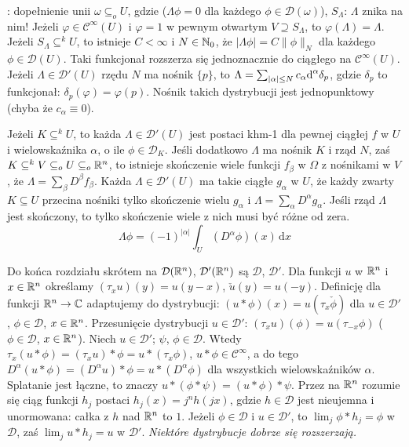 :  dopełnienie unii $\omega \subseteq_o U$, gdzie  ($\Lambda \phi = 0$ dla każdego $\phi \in \mathcal D(\omega)$), $S_\Lambda$: $\Lambda$ znika na nim!
Jeżeli $\varphi \in \mathscr C^\infty (U)$ i $\varphi = 1$ w pewnym otwartym $V \supseteq S_\Lambda$, to $\varphi(\Lambda) = \Lambda$.
Jeżeli $S_\Lambda \subseteq^k U$, to istnieje $C < \infty$ i $N \in \mathbb N_0$, że $|\Lambda \phi| = C \|\phi\|_N$ dla każdego $\phi \in \mathcal D(U)$.
Taki funkcjonał rozszerza się jednoznacznie do ciągłego na $\mathscr C^\infty (U)$.
Jeżeli $\Lambda \in \mathcal D'(U)$ rzędu $N$ ma nośnik $\{p\}$, to $\Lambda = \sum_{|\alpha| \le N} c_\alpha \textrm{d}^\alpha \delta_p$, gdzie $\delta_p$ to funkcjonał: $\delta_p(\varphi) = \varphi(p)$.
Nośnik takich dystrybucji jest jednopunktowy (chyba że $c_\alpha \equiv 0$).

Jeżeli  $K \subseteq^k U$, to każda $\Lambda \in \mathcal D'(U)$ jest postaci khm-1 dla pewnej ciągłej $f$ w $U$ i wielowskaźnika $\alpha$, o ile $\phi \in \mathcal D_K$.
Jeśli dodatkowo $\Lambda$ ma nośnik $K$ i rząd $N$, zaś $K \subseteq^k V \subseteq_o U \subseteq_o \mathbb{R}^n$, to istnieje skończenie wiele funkcji $f_\beta$ w $\Omega$ z nośnikami w $V$, że $\Lambda = \sum_\beta D^\beta f_\beta$.
Każda $\Lambda \in \mathcal D'(U)$ ma takie ciągłe $g_\alpha$ w $U$, że każdy zwarty $K \subseteq U$ przecina nośniki tylko skończenie wielu $g_\alpha$ i $\Lambda = \sum_\alpha D^\alpha g_\alpha$.
Jeśli rząd $\Lambda$ jest skończony, to tylko skończenie wiele z nich musi być różne od zera.
\[
	\Lambda \phi = (-1)^{|\alpha|} \int_U (D^\alpha \phi)(x) \,\textrm{d} x
\]

Do końca  rozdziału skrótem na $\mathcal D(\mathbb{R}^n)$, $\mathcal D'(\mathbb{R}^n)$ są $\mathcal D$, $\mathcal D'$.
Dla funkcji $u$ w $\mathbb{R}^n$ i $x \in \mathbb{R}^n$ określamy $(\tau_x u) (y) = u(y-x)$, $\check u (y) = u(-y)$.
Definicję  dla funkcji $\mathbb{R}^n \to \mathbb{C}$ adaptujemy do dystrybucji: $(u* \phi)(x) = u(\tau_x \check \phi)$ dla $u \in \mathcal D'$, $\phi \in \mathcal D$, $x \in \mathbb{R}^n$.
Przesunięcie dystrybucji $u \in \mathcal D'$: $(\tau_xu)(\phi) = u(\tau_{-x} \phi)$ ($\phi \in \mathcal D$, $x \in \mathbb{R}^n$).
Niech $u \in \mathcal D'$; $\psi$, $\phi \in \mathcal D$.
Wtedy $\tau_x(u * \phi) = (\tau_x u) * \phi = u * (\tau_x\phi)$, $u * \phi \in \mathscr C^\infty$, a do tego $D^\alpha(u * \phi) = (D^\alpha u) * \phi = u * (D^\alpha \phi)$ dla wszystkich wielowskaźników $\alpha$.
Splatanie jest łączne, to znaczy $u * (\phi * \psi) = (u * \phi) * \psi$.
Przez  na $\mathbb{R}^n$ rozumie się ciąg funkcji $h_j$ postaci $h_j(x) = j^n h(jx)$, gdzie $h \in \mathcal D$ jest nieujemna i unormowana: całka z $h$ nad $\mathbb{R}^n$ to $1$.
Jeżeli $\phi \in \mathcal D$ i $u \in \mathcal D'$, to $\lim_j \phi * h_j = \phi$ w $\mathcal D$, zaś $\lim_j u * h_j = u$ w $\mathcal D'$.
\emph{Niektóre dystrybucje dobrze się rozszerzają.} %
